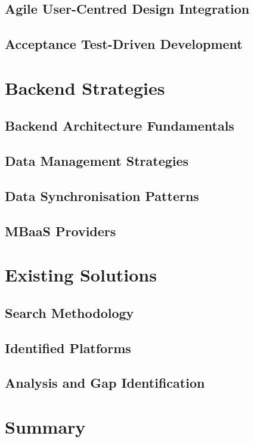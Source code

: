\subsection{Agile User-Centred Design Integration}
\label{subsec:sota-aucd}

\subsection{Acceptance Test-Driven Development}
\label{subsec:sota-atdd}

\section{Backend Strategies}
\label{sec:sota-backend}

\subsection{Backend Architecture Fundamentals}
\label{subsec:sota-backend-fundamentals}

\subsection{Data Management Strategies}
\label{subsec:sota-data}

\subsection{Data Synchronisation Patterns}
\label{subsec:sota-sync}

\subsection{MBaaS Providers}
\label{subsec:sota-mbaas}

\section{Existing Solutions}
\label{sec:sota-existing}

\subsection{Search Methodology}
\label{subsec:sota-search}

\subsection{Identified Platforms}
\label{subsec:sota-platforms}

\subsection{Analysis and Gap Identification}
\label{subsec:sota-gaps}

\section{Summary}
\label{sec:sota-summary}

